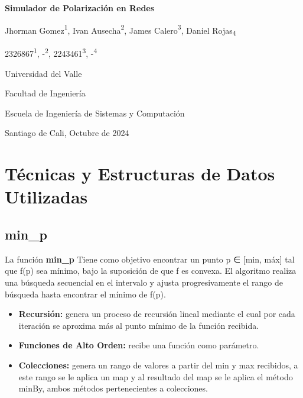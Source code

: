 \documentclass{article}
\begin{document}
  \begin{titlepage}
    \centering
    \vspace*{2cm}
    
    \Huge
    \textbf{Simulador de Polarización en Redes}
    
    \vspace{1.5cm}
    
    \Large
    Jhorman Gomez{\textsuperscript{1}}, Ivan Ausecha{\textsuperscript{2}}, James Calero{\textsuperscript{3}}, Daniel Rojas{\textsubscript{4}}
    
    \vspace{0.5cm}
    
    \large
    2326867{\textsuperscript{1}}, -{\textsuperscript{2}}, 2243461{\textsuperscript{3}}, -{\textsuperscript{4}}
    
    \vspace{0.5cm}
    
    \Large
    Universidad del Valle
    
    \vspace{0.5cm}
    
    \large
    Facultad de Ingeniería
    
    \vspace{0.5cm}
    
    \large
    Escuela de Ingeniería de Sistemas y Computación
    
    \vspace{0.5cm}
    
    \large
    Santiago de Cali, Octubre de 2024
    
  \end{titlepage}

  \section{Técnicas y Estructuras de Datos Utilizadas}
    
    \subsection{min\_p}
    La función \textbf{min\_p} Tiene como objetivo encontrar un punto p ∈ [min, máx] tal que f(p) sea mínimo, bajo la suposición de que f es convexa. El algoritmo realiza una búsqueda secuencial en el intervalo y ajusta progresivamente el rango de búsqueda hasta encontrar el mínimo de f(p).

    \begin{itemize}
      \item \textbf{Recursión:} genera un proceso de recursión lineal mediante el cual por cada iteración se aproxima más al punto mínimo de la función recibida.
      \item \textbf{Funciones de Alto Orden:} recibe una función como parámetro.
      \item \textbf{Colecciones:} genera un rango de valores a partir del min y max recibidos, a este rango se le aplica un map y al resultado del map se le aplica el método minBy, ambos métodos pertenecientes a colecciones.
    \end{itemize}
\end{document}
